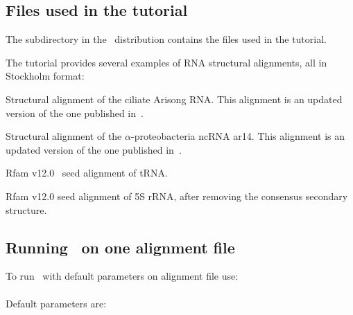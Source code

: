 \subsection{Files used in the tutorial}

The subdirectory  in the \rscape\ distribution contains the
files used in the tutorial. 

The tutorial provides several examples of RNA structural
alignments, all in Stockholm format:

\begin{sreitems}{}
\item[\emprog{updated\_Arisong.sto}] Structural alignment of the ciliate
  Arisong RNA. This alignment is an updated
  version of the one published in~\citep{JungEddy11}.
\item[\emprog{ar14.sto}] Structural alignment of the $\alpha$-proteobacteria ncRNA ar14. This alignment is an updated version of the one
  published in~\citep{delVal12}.
\item[\emprog{RF00005.sto}] Rfam v12.0~\citep{Nawrocki15} seed alignment of tRNA. 
\item[\emprog{RF00001-noss.sto}] Rfam v12.0 seed alignment of 5S rRNA, after removing the consensus secondary structure. 
\end{sreitems}


\subsection{Running \rscape\, on one alignment file}
To run \rscape\ with default parameters on alignment file
 use:\\

\\

\noindent
Default parameters are:

